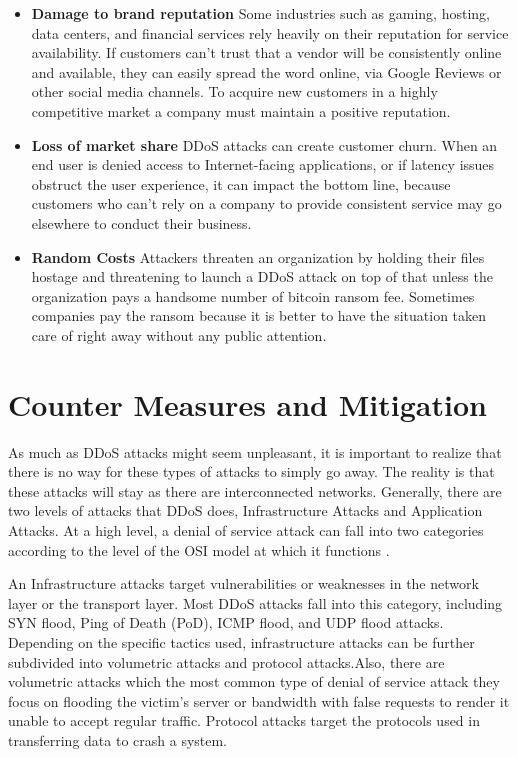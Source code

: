 \documentclass[a4paper, 12pt]{report} %
\begin{document}
\begin{table}[h!]
\begin{itemize}
                    \item \textbf{Damage to brand reputation}  Some industries such as gaming, hosting, data centers, and financial services rely heavily on their reputation for service availability. If customers can’t trust that a vendor will be consistently online and available, they can easily spread the word online, via Google Reviews or other social media channels. To acquire new customers in a highly competitive market a company must maintain a positive reputation.
                    \item \textbf{Loss of market share}  DDoS attacks can create customer churn. When an end user is denied access to Internet-facing applications, or if latency issues obstruct the user experience, it can impact the bottom line, because customers who can’t rely on a company to provide consistent service may go elsewhere to conduct their business.

                    \item \textbf{Random Costs}  Attackers threaten an organization by holding their files hostage and threatening to launch a DDoS attack on top of that unless the organization pays a handsome number of bitcoin ransom fee. Sometimes companies pay the ransom because it is better to have the situation taken care of right away without any public attention.

                \end{itemize}
                

                \section{Counter Measures and Mitigation}
                    As much as DDoS attacks might seem unpleasant, it is important to realize that there is no way for these types of attacks to simply go away. The reality is that these attacks will stay as there are interconnected networks. Generally, there are two levels of attacks that DDoS does, Infrastructure Attacks and Application Attacks. At a high level, a denial of service attack can fall into two categories according to the level of the OSI model at which it functions \cite{a10networksDDoSAttack}.
                    
                    An Infrastructure attacks target vulnerabilities or weaknesses in the network layer or the transport layer. Most DDoS attacks fall into this category, including SYN flood, Ping of Death (PoD), ICMP flood, and UDP flood attacks. Depending on the specific tactics used, infrastructure attacks can be further subdivided into volumetric attacks and protocol attacks.Also, there are volumetric attacks which the most common type of denial of service attack they focus on flooding the victim’s server or bandwidth with false requests to render it unable to accept regular traffic. Protocol attacks target the protocols used in transferring data to crash a system.


\end{table}
\end{document}
